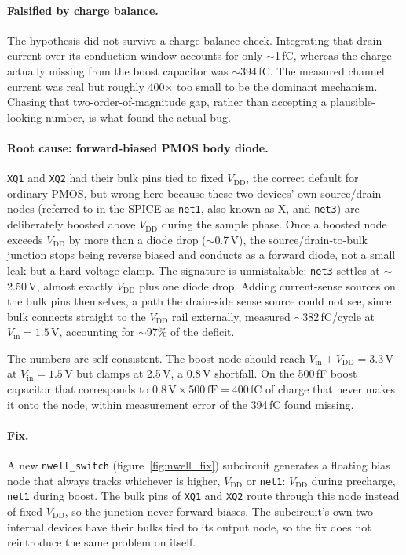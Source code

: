 \documentclass[12pt, a4paper]{article}
\begin{document}
\paragraph{Falsified by charge balance.} The hypothesis did not survive a
charge-balance check. Integrating that drain current over its conduction
window accounts for only $\sim$1\,fC, whereas the charge actually missing
from the boost capacitor was $\sim$394\,fC. The
measured channel current was real but roughly 400$\times$ too small to be
the dominant mechanism. Chasing that two-order-of-magnitude gap, rather
than accepting a plausible-looking number, is what found the actual bug.

\paragraph{Root cause: forward-biased PMOS body diode.} \texttt{XQ1} and
\texttt{XQ2} had their bulk pins tied to fixed $V_\mathrm{DD}$, the
correct default for ordinary PMOS, but wrong here because these two
devices' own source/drain nodes (referred to in the SPICE as \texttt{net1}, also known as X, and \texttt{net3}) are
deliberately boosted above $V_\mathrm{DD}$ during the sample phase. Once a
boosted node exceeds $V_\mathrm{DD}$ by more than a diode drop
($\sim$0.7\,V), the source/drain-to-bulk junction stops being reverse
biased and conducts as a forward diode, not a small leak but a hard
voltage clamp. The signature is unmistakable: \texttt{net3} settles at
$\sim$2.50\,V, almost exactly $V_\mathrm{DD}$ plus one diode drop. Adding
current-sense sources on the bulk pins themselves, a path the
drain-side sense source could not see, since bulk connects straight to the
$V_\mathrm{DD}$ rail externally, measured $\sim$382\,fC/cycle at
$V_\mathrm{in}=1.5$\,V, accounting for $\sim$97\% of the deficit.

The numbers are self-consistent. The boost node should reach
$V_\mathrm{in}+V_\mathrm{DD}=3.3$\,V at $V_\mathrm{in}=1.5$\,V but clamps
at 2.5\,V, a 0.8\,V shortfall. On the 500\,fF boost capacitor that
corresponds to $0.8\,\mathrm{V}\times 500\,\mathrm{fF}=400$\,fC of charge
that never makes it onto the node, within measurement error of the
394\,fC found missing.

\paragraph{Fix.} A new \texttt{nwell\_switch} (figure~\ref{fig:nwell_fix}) subcircuit generates a
floating bias node that always tracks whichever is higher,
$V_\mathrm{DD}$ or \texttt{net1}: $V_\mathrm{DD}$ during precharge,
\texttt{net1} during boost. The bulk pins of \texttt{XQ1} and \texttt{XQ2}
route through this node instead of fixed $V_\mathrm{DD}$, so the junction
never forward-biases. The subcircuit's own two internal devices have their
bulks tied to its output node, so the fix does not reintroduce the same
problem on itself.
\end{document}
